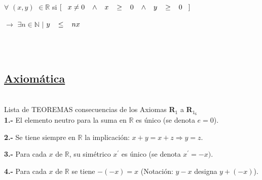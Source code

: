 \documentclass[12pt]{article}
\begin{document}
\begin{center}
    $\forall$ $ ( x , y) $ $\in \mathbb{R}$ \hspace{0.3 cm} si \hspace{0.3 cm} $\left[\hspace{0.3 cm} x \neq 0 \hspace{0.3 cm} \wedge \hspace{0.3 cm} x \hspace{0.3 cm} \geq \hspace{0.3 cm} 0 \hspace{0.3 cm} \wedge \hspace{0.3 cm} y \hspace{0.3 cm} \geq \hspace{0.3 cm} 0 \hspace{0.3 cm} \right]$ 
\end{center}
\begin{center}
 $\rightarrow$ \hspace{0.3 cm} $\exists n \in \mathbb{N}$  $\mid$ $y \hspace{0.3 cm} \leq \hspace{0.3 cm} nx$   
\end{center} \\\\
\newpage
\begin{center}
    \section*{\underline{Axiomática}}
\end{center}\\

Lista de TEOREMAS consecuencias de los Axiomas \textbf{R}$_1$ a \textbf{R}$_1_6$\\

\textbf{1.-}  El elemento neutro para la suma en $\mathbb{R}$ es único (se denota $e=0$).\vspace{0.2cm}


\textbf{2.-}  Se tiene siempre en $\mathbb{R}$ la implicación: \hspace{0.3cm} $x+y=x+z \Rightarrow y=z$. \vspace{0.2cm}


\textbf{3.-}  Para cada $x$ de $\mathbb{R}$, su simétrico $x^{\prime}$ es único (se denota $x^{\prime} = -x)$.\vspace{0.2cm}


\textbf{4.-}  Para cada $x$ de $\mathbb{R}$ se tiene $-(-x)=x$ \hspace{0.1cm} (Notación: $y-x$ designa $y+(-x)$).\vspace{0.2cm}
\end{document}
